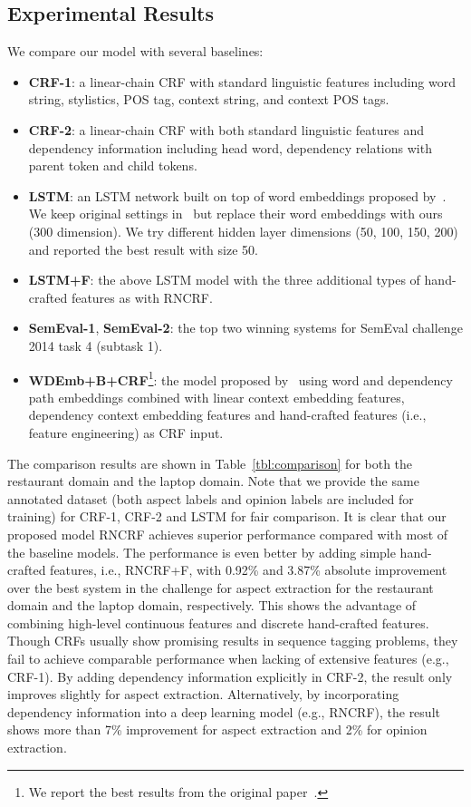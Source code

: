 \documentclass[11pt,letterpaper]{article}
\begin{document}
\subsection{Experimental Results}
We compare our model with several baselines:
\begin{itemize}
\item \textbf{CRF-1}: a linear-chain CRF with standard linguistic features including word string, stylistics, POS tag, context string, and context POS tags.
\item \textbf{CRF-2}: a linear-chain CRF with both standard linguistic features and dependency information including head word, dependency relations with parent token and child tokens.
\item \textbf{LSTM}: an LSTM network built on top of word embeddings proposed by~\cite{liu15}. We keep original settings in~\cite{liu15} but replace their word embeddings with ours (300 dimension).
We try different hidden layer dimensions (50, 100, 150, 200) and reported the best result with size 50.
\item \textbf{LSTM+F}: the above LSTM model with the three additional types of hand-crafted features as with RNCRF.
\item \textbf{SemEval-1}, \textbf{SemEval-2}: the top two winning systems for SemEval challenge 2014 task 4 (subtask 1).
\item \textbf{WDEmb+B+CRF}\footnote{We report the best results from the original paper~\cite{Yin16}.}: the model proposed by~\cite{Yin16} using word and dependency path embeddings combined with linear context embedding features, dependency context embedding features and hand-crafted features (i.e., feature engineering) as CRF input.
\end{itemize}
The comparison results are shown in Table~\ref{tbl:comparison} for both the restaurant domain and the laptop domain. Note that we provide the same annotated dataset (both aspect labels and opinion labels are included for training) for CRF-1, CRF-2 and LSTM for fair comparison. It is clear that our proposed model RNCRF achieves superior performance compared with most of the baseline models. The performance is even better by adding simple hand-crafted features, i.e., RNCRF+F, with 0.92\% and 3.87\% absolute improvement over the best system in the challenge for aspect extraction for the restaurant domain and the laptop domain, respectively. This shows the advantage of combining high-level continuous features and discrete hand-crafted features. Though CRFs usually show promising results in sequence tagging problems, they fail to achieve comparable performance when lacking of extensive features (e.g., CRF-1). By adding dependency information explicitly in CRF-2, the result only improves slightly for aspect extraction. Alternatively, by incorporating dependency information into a deep learning model (e.g., RNCRF), the result shows more than 7\% improvement for aspect extraction and 2\% for opinion extraction.
\end{document}

